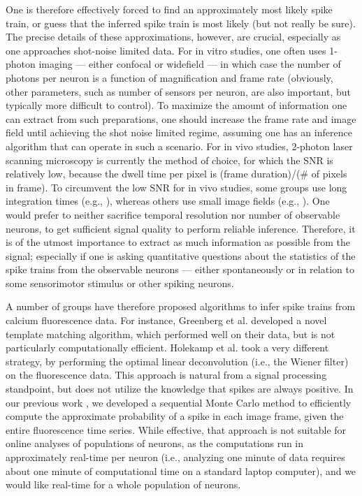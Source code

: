 One is therefore effectively forced to find an approximately most likely spike train, or guess that the inferred spike train is most likely (but not really be sure).  The precise details of these approximations, however, are crucial, especially as one approaches shot-noise limited data. For in vitro studies, one often uses 1-photon imaging --- either confocal or widefield --- in which case the number of photons per neuron is a function of magnification and frame rate (obviously, other parameters, such as number of sensors per neuron, are also important, but typically more difficult to control).  To maximize the amount of information one can extract from such preparations, one should increase the frame rate and image field until achieving the shot noise limited regime, assuming one has an inference algorithm that can operate in such a scenario.  For in vivo studies, 2-photon laser scanning microscopy is currently the method of choice, for which the SNR is relatively low,  because the dwell time per pixel is (frame duration)/($\#$ of pixels in frame).  To circumvent the low SNR for in vivo studies, some groups use long integration times (e.g., \cite{OhkiReid06}), whereas others use small image fields (e.g., \cite{KerrHelmchen07}).  One would prefer to neither sacrifice temporal resolution nor number of observable neurons, to get sufficient signal quality to perform reliable inference.  Therefore, it is of the utmost importance to extract as much information as possible from the signal; especially if one is asking quantitative questions about the statistics of the spike trains from the observable neurons --- either spontaneously or in relation to some sensorimotor stimulus or other spiking neurons.


A number of groups have therefore proposed algorithms to infer spike trains from calcium fluorescence data.  For instance, Greenberg et al. \cite{GreenbergKerr08} developed a novel template matching algorithm, which performed well on their data, but is not particularly computationally efficient.  Holekamp et al. \cite{HolekampHoly08} took a very different strategy, by performing the optimal linear deconvolution (i.e., the Wiener filter) on the fluorescence data.  This approach is natural from a signal processing standpoint, but does not utilize the knowledge that spikes are always positive.  In our previous work \cite{VogelsteinPaninski09}, we developed a sequential Monte Carlo method to efficiently compute the approximate probability of a spike in each image frame, given the entire fluorescence time series.   While effective, that approach is not suitable for online analyses of populations of neurons, as the computations run in approximately real-time per neuron (i.e., analyzing one minute of data requires about one minute of computational time on a standard laptop computer), and we would like real-time for a whole population of neurons.

